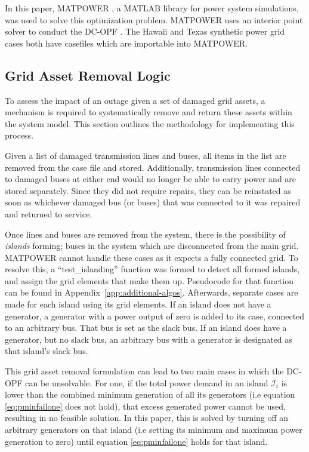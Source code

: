 \documentclass[12pt]{article}
\begin{document}
In this paper, MATPOWER \cite{zimmerman}, a MATLAB library for power system simulations, was used to solve this optimization problem. MATPOWER uses an interior point solver to conduct the DC-OPF \cite{zimmerman}. The Hawaii and Texas synthetic power grid cases both have casefiles which are importable into MATPOWER. \par

\subsection{Grid Asset Removal Logic}
To assess the impact of an outage given a set of damaged grid assets, a mechanism is required to systematically remove and return these assets within the system model. This section outlines the methodology for implementing this process. \par
Given a list of damaged transmission lines and buses, all items in the list are removed from the case file and stored. Additionally, transmission lines connected to damaged buses at either end would no longer be able to carry power and are stored separately. Since they did not require repairs, they can be reinstated as soon as whichever damaged bus (or buses) that was connected to it was repaired and returned to service. \par
Once lines and buses are removed from the system, there is the possibility of \textit{islands} forming; buses in the system which are disconnected from the main grid. MATPOWER cannot handle these cases as it expects a fully connected grid. To resolve this, a “test\_islanding” function was formed to detect all formed islands, and assign the grid elements that make them up. Pseudocode for that function can be found in Appendix~\ref{app:additional-algos}. Afterwards, separate cases are made for each island using its grid elements. If an island does not have a generator, a generator with a power output of zero is added to its case, connected to an arbitrary bus. That bus is set as the slack bus. If an island does have a generator, but no slack bus, an arbitrary bus with a generator is designated as that island's slack bus. \par
This grid asset removal formulation can lead to two main cases in which the DC-OPF can be unsolvable. For one, if the total power demand in an island $\mathcal{I}_i$ is lower than the combined minimum generation of all its generators (i.e equation \eqref{eq:pminfailone} does not hold), that excess generated power cannot be used, resulting in no feasible solution. In this paper, this is solved by turning off an arbitrary generators on that island (i.e setting its minimum and maximum power generation to zero) until equation \eqref{eq:pminfailone} holds for that island. 
\end{document}
